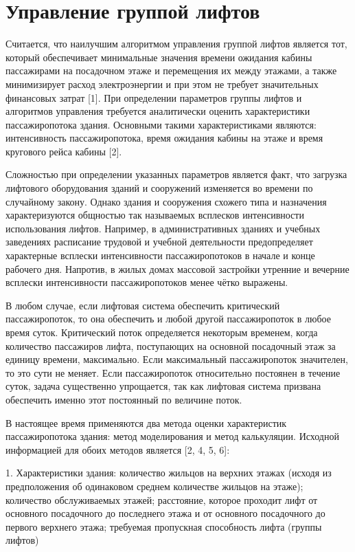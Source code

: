 \section{ Управление группой лифтов}

	Считается, что наилучшим алгоритмом управления группой лифтов является тот, который обеспечивает минимальные значения
		времени ожидания кабины пассажирами на посадочном этаже и перемещения их между этажами, а также минимизирует расход
		электроэнергии и при этом не требует значительных финансовых затрат [1].
		При определении параметров группы лифтов и алгоритмов управления требуется аналитически оценить характеристики
		пассажиропотока здания.
		Основными такими характеристиками являются: интенсивность пассажиропотока, время ожидания кабины на этаже и время
		кругового рейса кабины [2].
		
	Сложностью при определении указанных параметров является факт, что загрузка лифтового
		оборудования зданий и сооружений изменяется во времени по случайному закону. Однако здания и сооружения схожего типа
		и назначения характеризуются общностью так называемых всплесков интенсивности использования лифтов.
		Например, в административных зданиях и учебных заведениях расписание трудовой и учебной деятельности предопределяет
		характерные всплески интенсивности пассажиропотоков в начале и конце рабочего дня.
		Напротив, в жилых домах массовой застройки утренние и вечерние всплески интенсивности пассажиропотоков
		менее чётко выражены.

	В любом случае, если лифтовая система обеспечить критический пассажиропоток, то она обеспечить и любой другой пассажиропоток
		в любое время суток. Критический поток определяется некоторым временем, когда количество пассажиров лифта, поступающих на
		основной посадочный этаж за единицу времени, максимально. Если максимальный пассажиропоток значителен, то это сути не меняет.
		Если пассажиропоток относительно постоянен в течение суток, задача существенно упрощается, так как лифтовая система
		призвана обеспечить именно этот постоянный по величине поток.

	В настоящее время применяются два метода оценки характеристик пассажиропотока здания: метод моделирования и метод калькуляции.
		Исходной информацией для обоих методов является [2, 4, 5, 6]:

	1. Характеристики здания: количество жильцов на верхних этажах (исходя из предположения об одинаковом среднем
		количестве жильцов на этаже); количество обслуживаемых этажей; расстояние, которое проходит лифт от основного посадочного
		до последнего этажа и от основного посадочного до первого верхнего этажа; требуемая пропускная способность лифта (группы лифтов)
		
